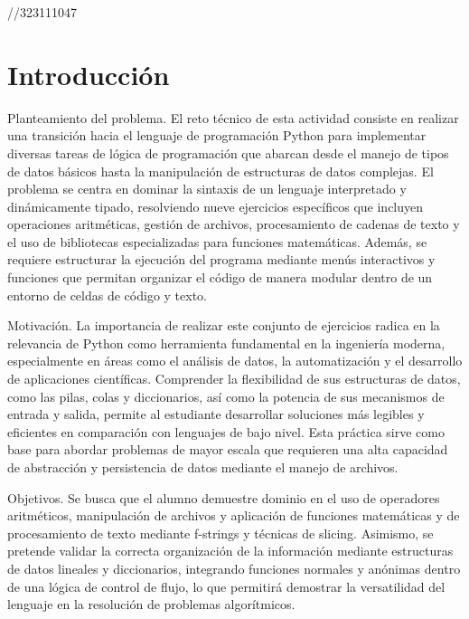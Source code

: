 //323111047

\section{Introducción}

Planteamiento del problema. El reto técnico de esta actividad consiste en realizar una transición hacia el lenguaje de programación Python para implementar diversas tareas de lógica de programación que abarcan desde el manejo de tipos de datos básicos hasta la manipulación de estructuras de datos complejas. El problema se centra en dominar la sintaxis de un lenguaje interpretado y dinámicamente tipado, resolviendo nueve ejercicios específicos que incluyen operaciones aritméticas, gestión de archivos, procesamiento de cadenas de texto y el uso de bibliotecas especializadas para funciones matemáticas. Además, se requiere estructurar la ejecución del programa mediante menús interactivos y funciones que permitan organizar el código de manera modular dentro de un entorno de celdas de código y texto.

\vspace{0.4cm}

Motivación. La importancia de realizar este conjunto de ejercicios radica en la relevancia de Python como herramienta fundamental en la ingeniería moderna, especialmente en áreas como el análisis de datos, la automatización y el desarrollo de aplicaciones científicas. Comprender la flexibilidad de sus estructuras de datos, como las pilas, colas y diccionarios, así como la potencia de sus mecanismos de entrada y salida, permite al estudiante desarrollar soluciones más legibles y eficientes en comparación con lenguajes de bajo nivel. Esta práctica sirve como base para abordar problemas de mayor escala que requieren una alta capacidad de abstracción y persistencia de datos mediante el manejo de archivos.

\vspace{0.4cm}

Objetivos. Se busca que el alumno demuestre dominio en el uso de operadores aritméticos, manipulación de archivos y aplicación de funciones matemáticas y de procesamiento de texto mediante f-strings y técnicas de slicing. Asimismo, se pretende validar la correcta organización de la información mediante estructuras de datos lineales y diccionarios, integrando funciones normales y anónimas dentro de una lógica de control de flujo, lo que permitirá demostrar la versatilidad del lenguaje en la resolución de problemas algorítmicos.